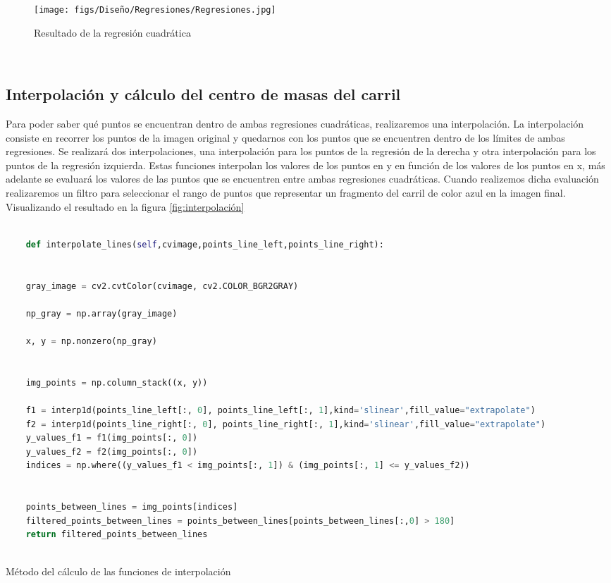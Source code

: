 \begin{figure} [H]
  \begin{center}
    \texttt{[image: figs/Diseño/Regresiones/Regresiones.jpg]}
  \end{center}
  \caption{Resultado de la regresión cuadrática}
  \label{fig:regresión cuadrática}
\end{figure}\

\subsection{Interpolación y cálculo del centro de masas del carril}
\label{sec:Interpolación y cálculo del centro de masas del carril}

Para poder saber qué puntos se encuentran dentro de ambas regresiones cuadráticas, realizaremos una interpolación. La interpolación consiste en recorrer
los puntos de la imagen original y quedarnos con los puntos que se encuentren dentro de los límites de ambas regresiones. Se realizará dos interpolaciones, una interpolación para 
los puntos de la regresión de la  derecha
y otra interpolación para los puntos de la regresión izquierda. Estas funciones interpolan los valores de los puntos en  y en función de los valores de los puntos en x, más adelante se evaluará los valores de las puntos que se encuentren entre 
ambas regresiones cuadráticas. Cuando realizemos dicha evaluación realizaremos un filtro para seleccionar el rango de puntos que representar un fragmento del carril de color azul en la imagen
final. Visualizando el resultado en la figura \ref{fig:interpolación} \newline

\begin{code}[h]
  \begin{lstlisting}[language=Python]

    def interpolate_lines(self,cvimage,points_line_left,points_line_right):


    gray_image = cv2.cvtColor(cvimage, cv2.COLOR_BGR2GRAY) 

    np_gray = np.array(gray_image)

    x, y = np.nonzero(np_gray)


    img_points = np.column_stack((x, y))

    f1 = interp1d(points_line_left[:, 0], points_line_left[:, 1],kind='slinear',fill_value="extrapolate")
    f2 = interp1d(points_line_right[:, 0], points_line_right[:, 1],kind='slinear',fill_value="extrapolate") 
    y_values_f1 = f1(img_points[:, 0])
    y_values_f2 = f2(img_points[:, 0])
    indices = np.where((y_values_f1 < img_points[:, 1]) & (img_points[:, 1] <= y_values_f2))
    
    
    points_between_lines = img_points[indices]
    filtered_points_between_lines = points_between_lines[points_between_lines[:,0] > 180]
    return filtered_points_between_lines
    

  \end{lstlisting}
  \caption[Método de interpolación]{Método del cálculo de las funciones de interpolación}
  \label{cod:codejemplo}
  \end{code}  



